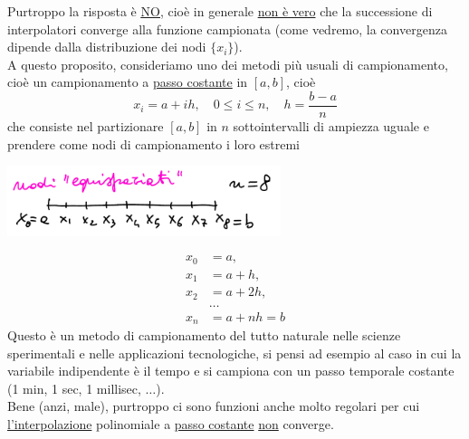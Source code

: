 \documentclass[12pt,headings=optiontohead]{article}
\begin{document}
Purtroppo la risposta è \uline{\uline{NO}}, cioè in generale \uline{non è vero} che la successione di interpolatori converge alla funzione campionata (come vedremo, la convergenza dipende dalla distribuzione dei nodi $\{x_i\}$).\\
A questo proposito, consideriamo uno dei metodi più usuali di campionamento, cioè un campionamento a \uline{passo costante} in $[a,b]$, cioè
\[ x_i = a+ih, \quad 0\le i \le n, \quad h = \frac{b-a}{n} \]
che consiste nel partizionare $[a,b]$ in $n$ sottointervalli di ampiezza uguale e prendere come nodi di campionamento i loro estremi
\begin{center}
    \includegraphics[width=0.6\textwidth]{lez12_img4.png}
\end{center}
\[ \begin{split}
    x_0 & = a, \\
    x_1 & = a + h, \\
    x_2 & = a + 2h, \\
    & \dotso \\
    x_n & = a+nh = b
\end{split} \]
Questo è un metodo di campionamento del tutto naturale nelle scienze sperimentali e nelle applicazioni tecnologiche, si pensi ad esempio al caso in cui la variabile indipendente è il tempo e si campiona con un passo temporale costante (1 min, 1 sec, 1 millisec, $\dotso$).\\
Bene (anzi, male), purtroppo ci sono funzioni anche molto regolari per cui \uline{l'interpolazione} polinomiale a \uline{passo costante} \uline{non} converge.
\end{document}

